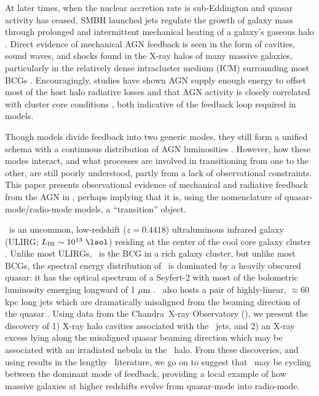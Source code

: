 \documentclass[useAMS,usenatbib]{mn2e}
\begin{document}
At later times, when the nuclear accretion rate is sub-Eddington and
quasar activity has ceased, SMBH launched jets regulate the growth of
galaxy mass through prolonged and intermittent mechanical heating of a
galaxy's gaseous halo \citep[\eg][]{2005MNRAS.363....2K,
  2006MNRAS.368....2D}. Direct evidence of mechanical AGN feedback is
seen in the form of cavities, sound waves, and shocks found in the
X-ray halos of many massive galaxies, particularly in the relatively
dense intracluster medium (ICM) surrounding most BCGs
\citep[\eg][]{perseus1, hydraa0, 2001ApJ...554..261C,
  2007ApJ...665.1057F, 2008MNRAS.390L..93S}. Encouragingly, studies
have shown AGN supply enough energy to offset most of the host halo
radiative losses \citep[\eg][]{perseus2, birzan04, dunn06} and that
AGN activity is closely correlated with cluster core conditions
\citep[\eg][]{haradent, rafferty08}, both indicative of the feedback
loop required in models.

Though models divide feedback into two generic modes, they still form
a unified schema \citep[\eg][]{sijacki07} with a continuous
distribution of AGN luminosities
\citep[\eg][]{2009ApJ...698.1550H}. However, how these modes interact,
and what processes are involved in transitioning from one to the
other, are still poorly understood, partly from a lack of
observational constraints. This paper presents observational evidence
of mechanical and radiative feedback from the AGN in \irs, perhaps
implying that it is, using the nomenclature of quasar-mode/radio-mode
models, a ``transition'' object.

\irs\ is an uncommon, low-redshift ($z = 0.4418$) ultraluminous
infrared galaxy (ULIRG; $L_{\rm{IR}} \sim 10^{13} ~\lsol$) residing at
the center of the cool core galaxy cluster \rxj. Unlike most ULIRGs,
\irs\ is the BCG in a rich galaxy cluster, but unlike most BCGs, the
spectral energy distribution of \irs\ is dominated by a heavily
obscured quasar: it has the optical spectrum of a Seyfert-2 with most
of the bolometric luminosity emerging longward of 1 $\mu$m
\citep{1988ApJ...328..161K, 1993ApJ...415...82H, 1994ApJ...436L..51F,
  1998ApJ...506..205E, 2000A&A...353..910F,
  2001MNRAS.321L..15I}. \irs\ also hosts a pair of highly-linear,
$\approx 60$ kpc long jets which are dramatically misaligned from the
beaming direction of the quasar \citep[][hereafter H93 and H99,
  respectively]{1993ApJ...415...82H, 1999ApJ...512..145H}. Using data
from the Chandra\ X-ray Observatory (\cxo), we present the discovery
of 1) X-ray halo cavities associated with the \irs\ jets, and 2) an
X-ray excess lying along the misaligned quasar beaming direction which
may be associated with an irradiated nebula in the \irs\ halo. From
these discoveries, and using results in the lengthy \irs\ literature,
we go on to suggest that \irs\ may be cycling between the dominant
mode of feedback, providing a local example of how massive galaxies at
higher redshifts evolve from quasar-mode into radio-mode.
\end{document}
